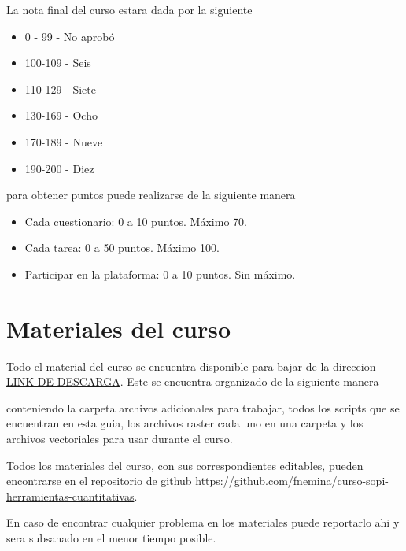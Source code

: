 La nota final del curso estara dada por la siguiente

\begin{itemize}
\item 0 - 99 - No aprobó
\item 100-109 - Seis
\item 110-129 - Siete
\item 130-169 - Ocho
\item 170-189 - Nueve
\item 190-200 - Diez
\end{itemize}

para obtener puntos puede realizarse de la siguiente manera

\begin{itemize}
  \item Cada cuestionario: 0 a 10 puntos. Máximo 70.
  \item Cada tarea: 0 a 50 puntos. Máximo 100.
  \item Participar en la plataforma: 0 a 10 puntos. Sin máximo.
\end{itemize}

\section{Materiales del curso}
Todo el material del curso se encuentra disponible para bajar de la direccion \url{LINK DE DESCARGA}. Este se encuentra organizado de la siguiente manera


conteniendo la carpeta  archivos adicionales para trabajar,  todos los scripts que se encuentran en esta guia,  los archivos raster cada uno en una carpeta y  los archivos vectoriales para usar durante el curso.

Todos los materiales del curso, con sus correspondientes editables, pueden
encontrarse en el repositorio de github \url{https://github.com/fnemina/curso-sopi-herramientas-cuantitativas}.

En caso de encontrar cualquier problema en los materiales puede reportarlo ahi y sera subsanado en el menor tiempo posible.
